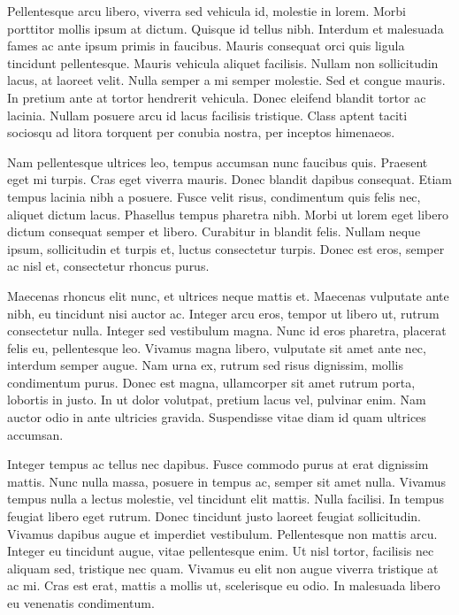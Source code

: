 Pellentesque arcu libero, viverra sed vehicula id, molestie in lorem. Morbi porttitor mollis ipsum at dictum. Quisque id tellus nibh. Interdum et malesuada fames ac ante ipsum primis in faucibus. Mauris consequat orci quis ligula tincidunt pellentesque. Mauris vehicula aliquet facilisis. Nullam non sollicitudin lacus, at laoreet velit. Nulla semper a mi semper molestie. Sed et congue mauris. In pretium ante at tortor hendrerit vehicula. Donec eleifend blandit tortor ac lacinia. Nullam posuere arcu id lacus facilisis tristique. Class aptent taciti sociosqu ad litora torquent per conubia nostra, per inceptos himenaeos.

Nam pellentesque ultrices leo, tempus accumsan nunc faucibus quis. Praesent eget mi turpis. Cras eget viverra mauris. Donec blandit dapibus consequat. Etiam tempus lacinia nibh a posuere. Fusce velit risus, condimentum quis felis nec, aliquet dictum lacus. Phasellus tempus pharetra nibh. Morbi ut lorem eget libero dictum consequat semper et libero. Curabitur in blandit felis. Nullam neque ipsum, sollicitudin et turpis et, luctus consectetur turpis. Donec est eros, semper ac nisl et, consectetur rhoncus purus.

Maecenas rhoncus elit nunc, et ultrices neque mattis et. Maecenas vulputate ante nibh, eu tincidunt nisi auctor ac. Integer arcu eros, tempor ut libero ut, rutrum consectetur nulla. Integer sed vestibulum magna. Nunc id eros pharetra, placerat felis eu, pellentesque leo. Vivamus magna libero, vulputate sit amet ante nec, interdum semper augue. Nam urna ex, rutrum sed risus dignissim, mollis condimentum purus. Donec est magna, ullamcorper sit amet rutrum porta, lobortis in justo. In ut dolor volutpat, pretium lacus vel, pulvinar enim. Nam auctor odio in ante ultricies gravida. Suspendisse vitae diam id quam ultrices accumsan.

Integer tempus ac tellus nec dapibus. Fusce commodo purus at erat dignissim mattis. Nunc nulla massa, posuere in tempus ac, semper sit amet nulla. Vivamus tempus nulla a lectus molestie, vel tincidunt elit mattis. Nulla facilisi. In tempus feugiat libero eget rutrum. Donec tincidunt justo laoreet feugiat sollicitudin. Vivamus dapibus augue et imperdiet vestibulum. Pellentesque non mattis arcu. Integer eu tincidunt augue, vitae pellentesque enim. Ut nisl tortor, facilisis nec aliquam sed, tristique nec quam. Vivamus eu elit non augue viverra tristique at ac mi. Cras est erat, mattis a mollis ut, scelerisque eu odio. In malesuada libero eu venenatis condimentum.

